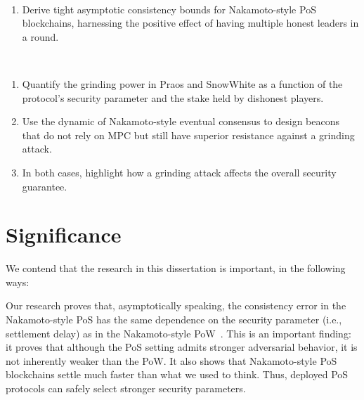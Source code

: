 \begin{description}[font=\normalfont\itshape\space]
  \item[Consistency Problem:]~
  \begin{enumerate}
    \item Derive tight asymptotic consistency bounds for Nakamoto-style PoS blockchains, 
    harnessing the positive effect of having multiple honest leaders in a round.

    \setcounter{ConsistencyObjectives}{\value{enumi}}
  \end{enumerate}

  \item[Grinding Problem:]~
  \begin{enumerate}
    \setcounter{enumi}{\value{ConsistencyObjectives}}

    \item Quantify the grinding power in Praos and SnowWhite 
    as a function of the protocol's security parameter and the 
    stake held by dishonest players.
    
    \item Use the dynamic of Nakamoto-style eventual consensus to design 
    beacons that do not rely on MPC but still have superior resistance 
    against a grinding attack.     

    \item In both cases, 
    highlight how a grinding attack affects the overall security guarantee.
  \end{enumerate}
\end{description}





\section{Significance}
We contend that the research in this dissertation is important, in the following ways:

  Our research proves that, asymptotically speaking, the consistency error 
  in the Nakamoto-style PoS has the same dependence on the security parameter 
  (i.e., settlement delay) 
  as in the Nakamoto-style PoW~\cite{LinearConsistencySODA,Multihonest}. 
  This is an important finding: 
  it proves that although the PoS setting 
  admits stronger adversarial behavior, 
  it is not inherently weaker than the PoW. 
  It also shows that Nakamoto-style PoS blockchains settle much faster than what we used to think. 
  Thus, deployed PoS protocols can safely select stronger security parameters. 

